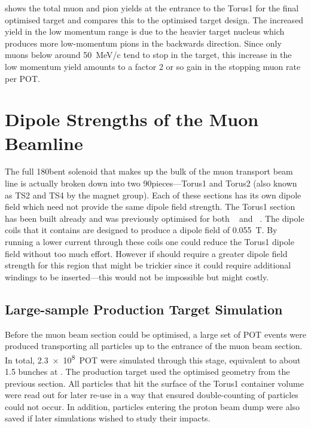  shows the total muon and pion yields at the entrance to the Torus1 for the final optimised \phaseII target and compares this to the optimised \phaseI target design.
The increased yield in the low momentum range is due to the heavier target nucleus which produces more low-momentum pions in the backwards direction.
Since only muons below around 50~MeV/c tend to stop in the target, this increase in the low momentum yield amounts to a factor 2 or so gain in the stopping muon rate per POT.

\section{Dipole Strengths of the Muon Beamline}

The full 180\degree bent solenoid that makes up the bulk of the muon transport beam line is actually broken down into two
90\degree pieces---Torus1 and Torus2 (also known as TS2 and TS4 by the magnet group).
Each of these sections has its own dipole field which need not provide the same dipole field strength.
The Torus1 section has been built already and was previously optimised for both \phaseI~\cite{TDR2016} and \phaseII~\cite{CDRphase2}. 
The dipole coils that it contains are designed to produce a dipole field of 0.055~T.
By running a lower current through these coils one could reduce the Torus1 dipole field without too much effort. 
However if \phaseII should require a greater dipole field strength for this region
that might be trickier since it could require additional windings to be inserted---this would not be impossible but might costly.

\subsection{Large-sample Production Target Simulation}
Before the muon beam section could be optimised, a large set of \ac{POT} events were produced transporting all particles up to the entrance of the muon beam section.
In total, \num{2.3e8}~POT were simulated through this stage, equivalent to about 1.5 bunches at \phaseII.
The production target used the optimised geometry from the previous section.
All particles that hit the surface of the Torus1 container volume were read out for later re-use in a way that ensured double-counting of particles could not occur.
In addition, particles entering the proton beam dump were also saved if later simulations wished to study their impacts.

